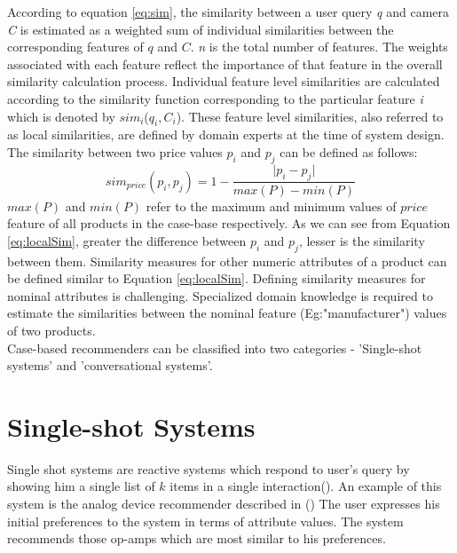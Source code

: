 According to equation \ref{eq:sim}, the similarity between a user query \textit{q} and camera \textit{C} is estimated 
as a weighted sum of individual similarities between the corresponding features of $q$ and $C$. 
\textit{n} is the total number of features.
The weights associated with each feature reflect the importance of that feature in the overall similarity calculation process. 
Individual feature level similarities are calculated according to the similarity function corresponding to the particular feature \textit{i} which is denoted by $sim_i$($q_i, C_i$).
These feature level similarities, also referred to as local similarities, are defined by domain experts at the time of system design.
The similarity between two price values $p_i$ and $p_j$ can be defined as follows:
\begin{equation}
\label{eq:localSim}
sim_{price}(p_i, p_j) = 1 - \frac{\lvert p_i - p_j \rvert}{max(P) - min(P)}
\end{equation}
$max(P)$ and $min(P)$ refer to the maximum and minimum values of $price$ feature of all products in the case-base respectively.
As we can see from Equation \ref{eq:localSim}, greater the difference between $p_i$ and $p_j$, lesser is the similarity between them.
Similarity measures for other numeric attributes of a product can be defined similar to Equation \ref{eq:localSim}.
Defining similarity measures for nominal attributes is challenging.
Specialized domain knowledge is required to estimate the similarities between the nominal feature (Eg:"manufacturer") values of two products.\\
Case-based recommenders can be classified into two categories - 'Single-shot systems' and 'conversational systems'.


\section{Single-shot Systems}
Single shot systems are reactive systems which respond to user's query by showing him a single list of $k$ items in a single interaction(\cite{smyth2007}).
An example of this system is the analog device recommender described in (\cite{wilke98}) 
The user expresses his initial preferences to the system in terms of attribute values.
The system recommends those op-amps which are most similar to his preferences. 

